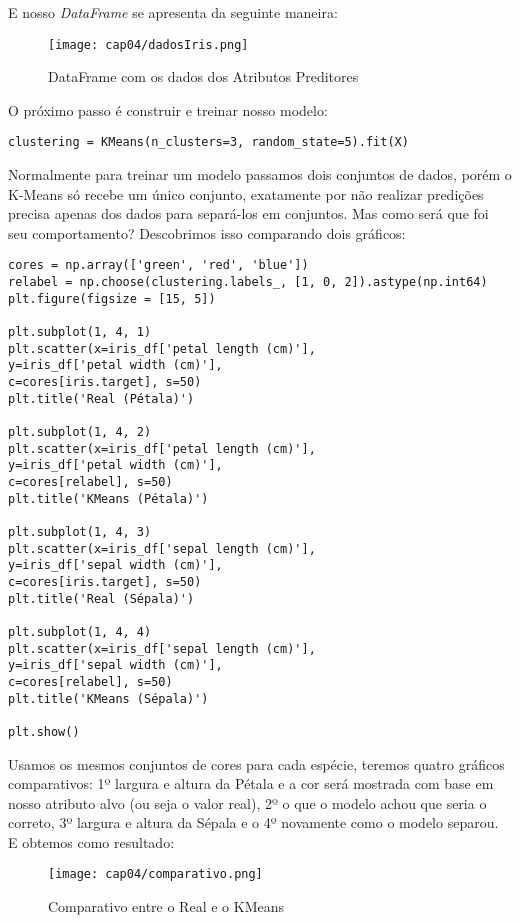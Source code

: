 E nosso \textit{DataFrame} se apresenta da seguinte maneira:
\begin{figure}[H]
	\centering
	\texttt{[image: cap04/dadosIris.png]}
	\caption{DataFrame com os dados dos Atributos Preditores}
\end{figure}

O próximo passo é construir e treinar nosso modelo:
\begin{lstlisting}[]
clustering = KMeans(n_clusters=3, random_state=5).fit(X)
\end{lstlisting}

Normalmente para treinar um modelo passamos dois conjuntos de dados, porém o K-Means só recebe um único conjunto, exatamente por não realizar predições precisa apenas dos dados para separá-los em conjuntos. Mas como será que foi seu comportamento? Descobrimos isso comparando dois gráficos:
\begin{lstlisting}[]
cores = np.array(['green', 'red', 'blue'])
relabel = np.choose(clustering.labels_, [1, 0, 2]).astype(np.int64)
plt.figure(figsize = [15, 5])

plt.subplot(1, 4, 1)
plt.scatter(x=iris_df['petal length (cm)'], 
y=iris_df['petal width (cm)'], 
c=cores[iris.target], s=50)
plt.title('Real (Pétala)')

plt.subplot(1, 4, 2)
plt.scatter(x=iris_df['petal length (cm)'], 
y=iris_df['petal width (cm)'], 
c=cores[relabel], s=50)
plt.title('KMeans (Pétala)')

plt.subplot(1, 4, 3)
plt.scatter(x=iris_df['sepal length (cm)'], 
y=iris_df['sepal width (cm)'], 
c=cores[iris.target], s=50)
plt.title('Real (Sépala)')

plt.subplot(1, 4, 4)
plt.scatter(x=iris_df['sepal length (cm)'], 
y=iris_df['sepal width (cm)'], 
c=cores[relabel], s=50)
plt.title('KMeans (Sépala)')

plt.show()
\end{lstlisting}

Usamos os mesmos conjuntos de cores para cada espécie, teremos quatro gráficos comparativos: 1º largura e altura da Pétala e a cor será mostrada com base em nosso atributo alvo (ou seja o valor real), 2º o que o modelo achou que seria o correto, 3º largura e altura da Sépala e o 4º novamente como o modelo separou. E obtemos como resultado:
\begin{figure}[H]
	\centering
	\texttt{[image: cap04/comparativo.png]}
	\caption{Comparativo entre o Real e o KMeans}
\end{figure}

